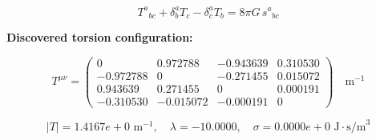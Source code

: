 
\begin{equation}
  T^a{}_{bc} + \delta^a_b T_c - \delta^a_c T_b = 8\pi G \, s^a{}_{bc}
\end{equation}

\textbf{Discovered torsion configuration:}

\begin{equation}
  T^{\mu\nu} = \begin{pmatrix}
    0 & 0.972788 & -0.943639 & 0.310530 \\
    -0.972788 & 0 & -0.271455 & 0.015072 \\
    0.943639 & 0.271455 & 0 & 0.000191 \\
    -0.310530 & -0.015072 & -0.000191 & 0
  \end{pmatrix} \quad \text{m}^{-1}
\end{equation}

\begin{equation}
  |T| = 1.4167e+0 \text{ m}^{-1}, \quad
  \lambda = -10.0000, \quad
  \sigma = 0.0000e+0 \text{ J}\cdot\text{s/m}^3
\end{equation}